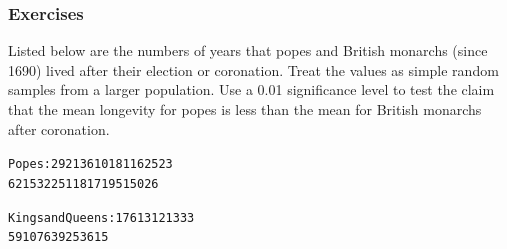\documentclass[xcolor=dvipsnames]{beamer}
\begin{document}





\begin{frame}
  \frametitle{Exercises}
{\ubung} Listed below are the numbers of years that
popes and British monarchs (since 1690) lived after their election
or coronation. Treat the values as simple random samples from a
larger population. Use a 0.01 significance level to test the claim
that the mean longevity for popes is less than the mean for
British monarchs after coronation.

\bigskip

\begin{alltt}
Popes: 2 9 21 3 6 10 18 11 6 25 23 
 6 2 15 32 25 11 8 17 19 5 15 0 26
\end{alltt}

\bigskip

\begin{alltt}
Kings and Queens: 17 6 13 12 13 33
             59 10 7 63 9 25 36 15
\end{alltt}
\end{frame}
\end{document}
